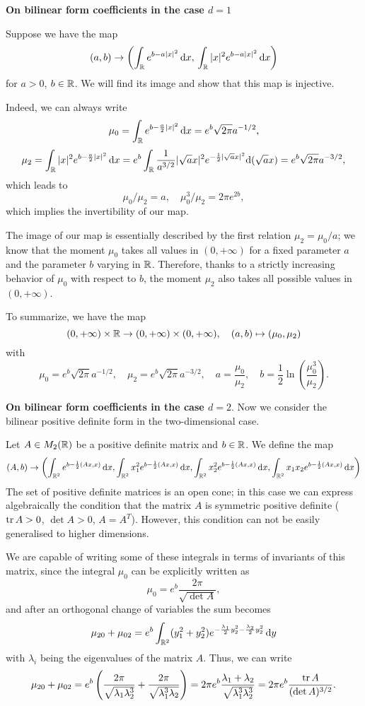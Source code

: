 \documentclass{article}
\begin{document}
\textbf{On bilinear form coefficients in the case $d=1$}

Suppose we have the map
\[
	(a,b)\to \left( \int_{{\mathbb R}}^{}e^{b-a|x|^2}{\,\mathrm{d} x},\, \int_{{\mathbb R}}^{}|x|^2 e^{b-a|x|^2}{\,\mathrm{d} x}\right)
\]
for $a>0$, $b\in{\mathbb R}$. We will find its image and show that this map is injective.

Indeed, we can always write
\[
	\mu_0=\int_{{\mathbb R}}^{}e^{b-\frac{a}{2}|x|^2}{\,\mathrm{d} x} = e^b \sqrt{2\pi}a^{-1/2},
\]
\[
	\mu_2=\int_{{\mathbb R}}^{}|x|^2e^{b-\frac{a}{2}|x|^2}{\,\mathrm{d} x} = e^b \int_{{\mathbb R}}\frac{1}{a^{3/2}}|\sqrt{a}x|^2e^{-\frac{1}{2}|\sqrt{a}x|^2}\mathrm d (\sqrt{a}x) = e^b \sqrt{2\pi}a^{-3/2},
\]
which leads to
\[
	\mu_0/\mu_2 = a,\quad \mu_0^3/\mu_2=2\pi e^{2b},
\]
which implies the invertibility of our map.

The image of our map is essentially described by the first relation $\mu_2=\mu_0/a$; we know that the moment $\mu_0$ takes all values in $(0,+\infty)$ for a fixed parameter $a$ and the parameter $b$ varying in ${\mathbb R}$. Therefore, thanks to a strictly increasing behavior of $\mu_0$ with respect to $b$, the moment $\mu_2$ also takes all possible values in $(0,+\infty)$.

To summarize, we have the map
\[
	(0,+\infty)\times {\mathbb R} \to (0,+\infty)\times(0,+\infty),\quad (a,b)\mapsto (\mu_0,\mu_2) 
\]
with
\[
	\mu_0 = e^b \sqrt{2\pi}a^{-1/2},\quad\mu_2 = e^b \sqrt{2\pi}a^{-3/2},\quad a = \frac{\mu_0}{\mu_2},\quad b = \frac{1}{2} \ln\left( \frac{\mu_0^3}{\mu_2} \right).
\]


\textbf{On bilinear form coefficients in the case $d=2$}.
Now we consider the bilinear positive definite form in the two-dimensional case.

Let $A\in M_2({\mathbb R})$ be a positive definite matrix and $b\in{\mathbb R}$. We define the map
\[
	(A,b)\to\left( \int_{{\mathbb R^2}}^{}e^{b-\frac{1}{2}(Ax,x)}{\,\mathrm{d} x}, \int_{{\mathbb R^2}}^{}x_1^2 e^{b-\frac{1}{2}(Ax,x)}{\,\mathrm{d} x},\int_{{\mathbb R^2}}^{}x_2^2e^{b-\frac{1}{2}(Ax,x)}{\,\mathrm{d} x},\int_{{\mathbb R^2}}^{}x_1x_2e^{b-\frac{1}{2}(Ax,x)}{\,\mathrm{d} x} \right)
\]
The set of positive definite matrices is an open cone; in this case we can express algebraically the condition that the matrix $A$ is symmetric positive definite ($\operatorname{tr}  A>0$, $\det A>0$, $A=A^T$). However, this condition can not be easily generalised to higher dimensions.

We are capable of writing some of these integrals in terms of invariants of this matrix, since the integral $\mu_0$ can be explicitly written as
\[
	\mu_0 = e^{b}\frac{2\pi}{\sqrt{\det A}}, 
\]
and after an orthogonal change of variables the sum becomes
\[
	\mu_{20}+\mu_{02} = e^{b}\int_{{\mathbb R^2}}^{}(y_1^2+y_2^2)e^{-\frac{\lambda_1}{2}y_2^2-\frac{\lambda_2}{2}y_2^2}{\,\mathrm dy}
\]
with $\lambda_i$ being the eigenvalues of the matrix $A$. Thus, we can write
\[
	\mu_{20}+\mu_{02} = e^b\left( \frac{2\pi}{\sqrt{\lambda_1\lambda_2^3}}+\frac{2\pi}{\sqrt{\lambda_1^3\lambda_2}} \right) = 2\pi e^b \frac{\lambda_1+\lambda_2}{\sqrt{\lambda_1^3\lambda_2^3}} = 2\pi e^b \frac{\operatorname{tr} A}{(\det A)^{3/2}}. 
\]
\end{document}
